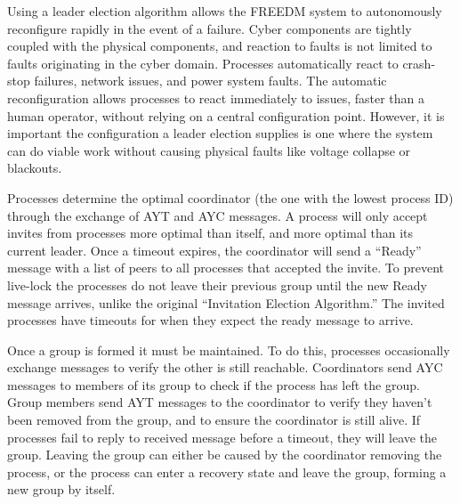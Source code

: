 Using a leader election algorithm allows the \ac{FREEDM} system to autonomously reconfigure rapidly in the event of a failure.
Cyber components are tightly coupled with the physical components, and reaction to faults is not limited to faults originating in the cyber domain.
Processes automatically react to crash-stop failures, network issues, and power system faults.
The automatic reconfiguration allows processes to react immediately to issues, faster than a human operator, without relying on a central configuration point.
However, it is important the configuration a leader election supplies is one where the system can do viable work without causing physical faults like voltage collapse or blackouts\cite{HARINI}.


Processes determine the optimal coordinator (the one with the lowest process ID) through the exchange of \ac{AYT} and \ac{AYC} messages.
A process will only accept invites from processes more optimal than itself, and more optimal than its current leader.
Once a timeout expires, the coordinator will send a ``Ready'' message with a list of peers to all processes that accepted the invite.
To prevent live-lock the processes do not leave their previous group until the new Ready message arrives, unlike the original ``Invitation Election Algorithm.''
The invited processes have timeouts for when they expect the ready message to arrive.

Once a group is formed it must be maintained.
To do this, processes occasionally exchange messages to verify the other is still reachable.
Coordinators send \ac{AYC} messages to members of its group to check if the process has left the group.
Group members send \ac{AYT} messages to the coordinator to verify they haven't been removed from the group, and to ensure the coordinator is still alive.
If processes fail to reply to received message before a timeout, they will leave the group.
Leaving the group can either be caused by the coordinator removing the process, or the process can enter a recovery state and leave the group, forming a new group by itself.

